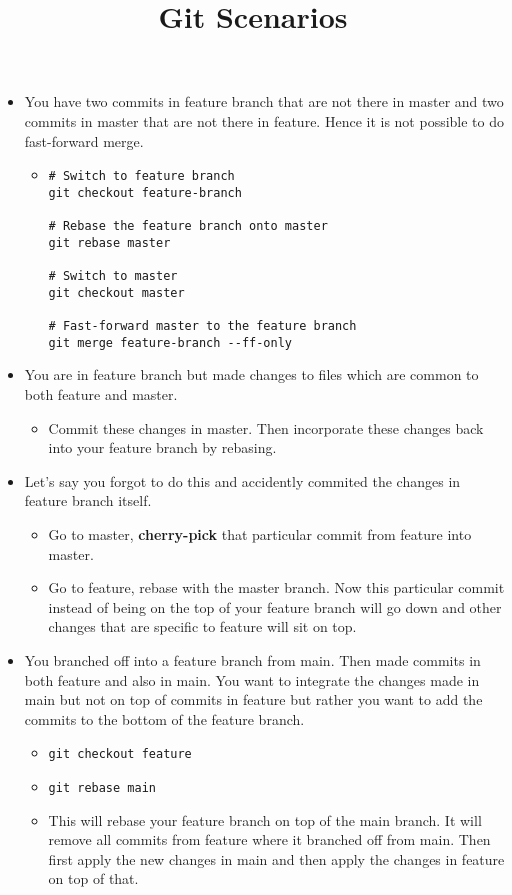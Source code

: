 \documentclass{../template/texnote}
\title{Git Scenarios}
\begin{document}
    \maketitle {}

	\begin{itemize}
            \item You have two commits in feature branch that are not there in master and two commits in master that are not there in feature. Hence it is not possible to do fast-forward merge.
                    \begin{itemize}
                        \item     \begin{verbatim}
# Switch to feature branch
git checkout feature-branch

# Rebase the feature branch onto master
git rebase master

# Switch to master
git checkout master

# Fast-forward master to the feature branch
git merge feature-branch --ff-only
                            \end{verbatim} 
                    \end{itemize}
		\item You are in feature branch but made changes to files which are common to both feature and master.
				\begin{itemize}
					\item Commit these changes in master. Then incorporate these changes back into your feature branch by rebasing.
				\end{itemize}
		\item Let's say you forgot to do this and accidently commited the changes in feature branch itself.
				\begin{itemize}
					\item Go to master, \textbf{cherry-pick} that particular commit from feature into master.
					\item Go to feature, rebase with the master branch. Now this particular commit instead of being on the top of your feature branch will go down and other changes that are specific to feature will sit on top.
				\end{itemize}
	\item You branched off into a feature branch from main. Then made commits in both feature and also in main. You want to integrate the changes made in main but not on top of commits in feature but rather you want to add the commits to the bottom of the feature branch.
		\begin{itemize}
			\item  \texttt{git checkout feature}
			\item \texttt{git rebase main}
			\item This will rebase your feature branch on top of the main branch. It will remove all commits from feature where it branched off from main. Then first apply the new changes in main and then apply the changes in feature on top of that.
		\end{itemize}
	\end{itemize}
    \printbibliography
\end{document}
